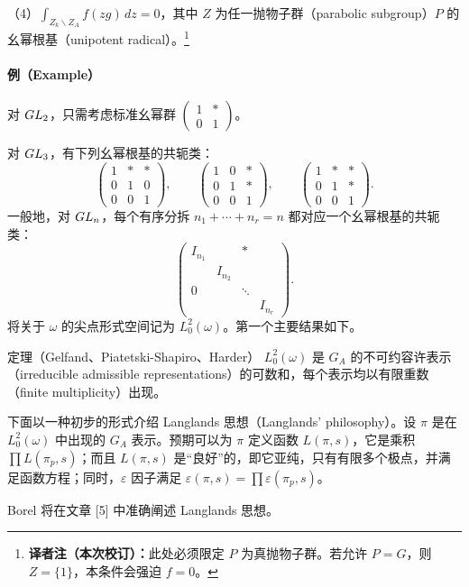 （4）$\int_{Z_k\backslash Z_A}f(zg)\,dz=0$，其中 $Z$ 为任一抛物子群（parabolic subgroup）$P$ 的幺幂根基（unipotent radical）。\footnote{\textbf{译者注（本次校订）：}此处必须限定 $P$ 为真抛物子群。若允许 $P=G$，则 $Z=\{1\}$，本条件会强迫 $f=0$。}

\paragraph*{例（Example）}对 $GL_2$，只需考虑标准幺幂群 $\begin{pmatrix}1&*\\0&1\end{pmatrix}$。

对 $GL_3$，有下列幺幂根基的共轭类：
\[
\begin{pmatrix}1&*&*\\0&1&0\\0&0&1\end{pmatrix},\qquad
\begin{pmatrix}1&0&*\\0&1&*\\0&0&1\end{pmatrix},\qquad
\begin{pmatrix}1&*&*\\0&1&*\\0&0&1\end{pmatrix}.
\]
一般地，对 $GL_n$，每个有序分拆 $n_1+\cdots+n_r=n$ 都对应一个幺幂根基的共轭类：
\[
\begin{pmatrix}
I_{n_1}&&*\\
&I_{n_2}&\\
0&&\ddots\\
&&&I_{n_r}
\end{pmatrix}.
\]
将关于 $\omega$ 的尖点形式空间记为 $L_0^2(\omega)$。第一个主要结果如下。
\begin{originaltheorem}{定理（Gelfand、Piatetski-Shapiro、Harder）}
$L_0^2(\omega)$ 是 $G_A$ 的不可约容许表示（irreducible admissible representations）的可数和，每个表示均以有限重数（finite multiplicity）出现。
\end{originaltheorem}
下面以一种初步的形式介绍 Langlands 思想（Langlands' philosophy）。设 $\pi$ 是在 $L_0^2(\omega)$ 中出现的 $G_A$ 表示。预期可以为 $\pi$ 定义函数 $L(\pi,s)$，它是乘积 $\prod L(\pi_p,s)$；而且 $L(\pi,s)$ 是“良好”的，即它亚纯，只有有限多个极点，并满足函数方程；同时，$\varepsilon$ 因子满足 $\varepsilon(\pi,s)=\prod\varepsilon(\pi_p,s)$。

Borel 将在文章 [5] 中准确阐述 Langlands 思想。

